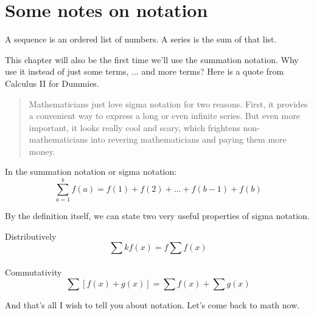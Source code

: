 \section{Some notes on notation}
\begin{definition}
    A sequence is an ordered list of numbers. A series is the sum of that list.
\end{definition}
This chapter will also be the first time we'll use the summation notation. Why use it instead of just some terms, $\dots$ and more terms? Here is a quote from Calculus II for Dummies.
\begin{quote}
    Mathematicians just love sigma notation for two reasons. First, it provides a convenient way to express a long or even infinite series. But even more important, it looks really cool and scary, which frightens non-mathematicians into revering mathematicians and paying them more money.
\end{quote}
\begin{definition}
    In the summation notation or sigma notation:\\
    \[\sum^b_{a=1}f(a)=f(1)+f(2)+\dots +f(b-1)+f(b)\]
\end{definition}
By the definition itself, we can state two very useful properties of sigma notation.
\begin{theorem}
Distributively
    \[\sum kf(x)=f\sum f(x)\]\\
Commutativity
    \[\sum[f(x)+g(x)]=\sum f(x) + \sum g(x)\]
\end{theorem}
And that's all I wish to tell you about notation. Let's come back to math now.
